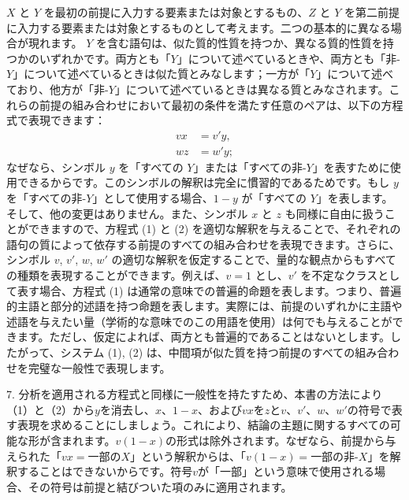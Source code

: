 \documentclass[a4paper,11pt,openany]{ltjsbook}
\begin{document}
$X$ と $Y$ を最初の前提に入力する要素または対象とするもの、$Z$ と $Y$ を第二前提に入力する要素または対象とするものとして考えます。二つの基本的に異なる場合が現れます。
$Y$ を含む語句は、似た質的性質を持つか、異なる質的性質を持つかのいずれかです。両方とも「$Y$」について述べているときや、両方とも「非-$Y$」について述べているときは似た質とみなします；一方が「$Y$」について述べており、他方が「非-$Y$」について述べているときは異なる質とみなされます。これらの前提の組み合わせにおいて最初の条件を満たす任意のペアは、以下の方程式で表現できます：
\begin{align*}
 \tag{1} vx &= v'y,\\
 \tag{2} wz &= w'y;
\end{align*}
なぜなら、シンボル $y$ を「すべての $Y$」または「すべての非-$Y$」を表すために使用できるからです。このシンボルの解釈は完全に慣習的であるためです。もし $y$ を「すべての非-$Y$」として使用する場合、$1-y$ が「すべての $Y$」を表します。そして、他の変更はありません。また、シンボル $x$ と $z$ も同様に自由に扱うことができますので、方程式 (1) と (2) を適切な解釈を与えることで、それぞれの語句の質によって依存する前提のすべての組み合わせを表現できます。さらに、シンボル $v$, $v'$, $w$, $w'$ の適切な解釈を仮定することで、量的な観点からもすべての種類を表現することができます。例えば、$v=1$ とし、$v'$ を不定なクラスとして表す場合、方程式 (1) は通常の意味での普遍的命題を表します。つまり、普遍的主語と部分的述語を持つ命題を表します。実際には、前提のいずれかに主語や述語を与えたい量（学術的な意味でのこの用語を使用）は何でも与えることができます。ただし、仮定によれば、両方とも普遍的であることはないとします。したがって、システム (1), (2) は、中間項が似た質を持つ前提のすべての組み合わせを完璧な一般性で表現します。

7. 分析を適用される方程式と同様に一般性を持たすため、本書の方法により（1）と（2）から$y$を消去し、$x$、$1-x$、および$vx$を$z$と$v$、$v'$、$w$、$w'$の符号で表す表現を求めることにしましょう。これにより、結論の主題に関するすべての可能な形が含まれます。$v(1-x)$の形式は除外されます。なぜなら、前提から与えられた「$vx=$一部の$X$」という解釈からは、「$v(1-x)=$一部の非-$X$」を解釈することはできないからです。符号$v$が「一部」という意味で使用される場合、その符号は前提と結びついた項のみに適用されます。
\end{document}
